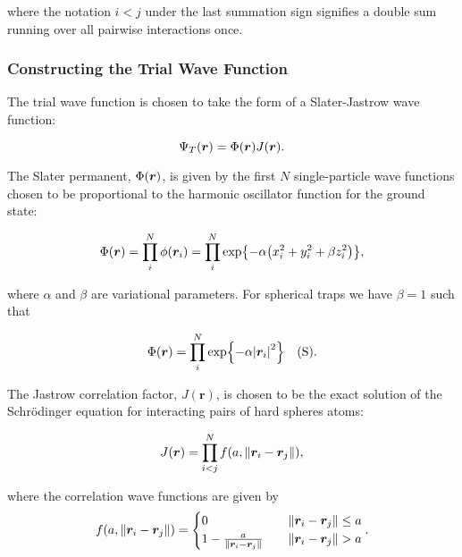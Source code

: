 where the notation $i<j$ under the last summation sign signifies a double sum running over all pairwise interactions once. 

\subsubsection{Constructing the Trial Wave Function}

The trial wave function is chosen to take the form of a Slater-Jastrow wave function: 

\begin{equation}\label{eq:twf}
    \Psi_T (\bm{r}) = \Phi \qty(\bm{r}) J \qty(\bm{r}).
\end{equation}

The Slater permanent, $\Phi \qty(\bm{r})$, is given by the first $N$ single-particle wave functions chosen to be proportional to the harmonic oscillator function for the ground state: 

\begin{equation}\label{eq:slater}
    \Phi \qty(\bm{r}) = \prod_i^N \phi \qty(\bm{r}_i) = \prod_i^N \exp{-\alpha \qty(x_i^2 + y_i^2 + \beta z_i^2)},
\end{equation}

where $\alpha$ and $\beta$ are variational parameters. For spherical traps we have $\beta = 1$ such that

\begin{equation}\label{eq:slater_spherical}
    \Phi \qty(\bm{r}) =  \prod_i^N \exp{-\alpha \abs{\bm{r}_i}^2} \quad \text{(S)}.
\end{equation} 

The Jastrow correlation factor, $J(\bm{r})$, is chosen to be the exact solution of the Schrödinger equation for interacting pairs of hard spheres atoms:

\begin{equation}
    J \qty(\bm{r}) = \prod_{i<j}^N f \qty(a, \norm{\bm{r}_i - \bm{r}_j}),
\end{equation}

where the correlation wave functions are given by
\begin{equation*}
    f \qty(a, \norm{\bm{r}_i - \bm{r}_j}) = 
    \begin{cases}
        0 \quad &\norm{\bm{r}_i - \bm{r}_j} \leq a
        \\
        1 - \frac{a}{\norm{\bm{r}_i - \bm{r}_j}} \quad &\norm{\bm{r}_i - \bm{r}_j} > a
    \end{cases}.
\end{equation*}


